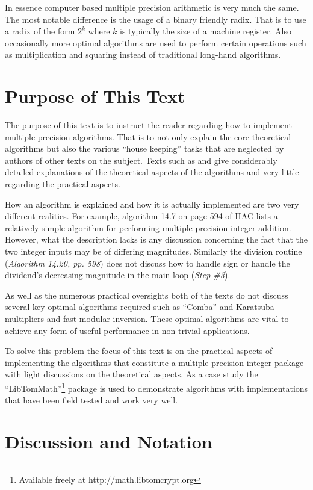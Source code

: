 \documentclass[b5paper]{book}
\begin{document}
In essence computer based multiple precision arithmetic is very much the same.  The most notable difference is the usage
of a binary friendly radix.  That is to use a radix of the form $2^k$ where $k$ is typically the size of a machine 
register.  Also occasionally more optimal algorithms are used to perform certain operations such as multiplication and 
squaring instead of traditional long-hand algorithms.

\section{Purpose of This Text}
The purpose of this text is to instruct the reader regarding how to implement multiple precision algorithms.  That is 
to not only explain the core theoretical algorithms but also the various ``house keeping'' tasks that are neglected by
authors of other texts on the subject.  Texts such as \cite[HAC]{HAC} and \cite{TAOCPV2} give considerably detailed 
explanations of the theoretical aspects of the algorithms and very little regarding the practical aspects.  

How an algorithm is explained and how it is actually implemented are two very different 
realities.  For example, algorithm 14.7 on page 594 of HAC lists a relatively simple algorithm for performing multiple 
precision integer addition.  However, what the description lacks is any discussion concerning the fact that the two 
integer inputs may be of differing magnitudes.  Similarly the division routine (\textit{Algorithm 14.20, pp. 598}) 
does not discuss how to handle sign or handle the dividend's decreasing magnitude in the main loop (\textit{Step \#3}).

As well as the numerous practical oversights both of the texts do not discuss several key optimal algorithms required 
such as ``Comba'' and Karatsuba multipliers and fast modular inversion.  These optimal algorithms are vital to achieve 
any form of useful performance in non-trivial applications.  

To solve this problem the focus of this text is on the practical aspects of implementing the algorithms that 
constitute a multiple precision integer package with light discussions on the theoretical aspects.  As a case 
study the ``LibTomMath''\footnote{Available freely at http://math.libtomcrypt.org} package is used to demonstrate 
algorithms with implementations that have been field tested and work very well.

\section{Discussion and Notation}
\end{document}
